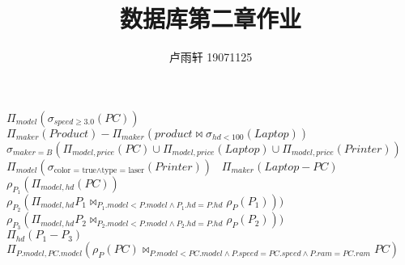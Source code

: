 \documentclass{ctexart}
\title{数据库第二章作业}
\author{卢雨轩 19071125}
\begin{document}
\maketitle

\begin{outline}[enumerate]
    \1[2.4.14]
        \2 $\Pi_{model}(\sigma_{speed \ge 3.0}(PC))$
        \2 $ \Pi_{maker}(Product) - \Pi_{maker}(product \Join \sigma_{hd < 100}(Laptop)) $
        \2 $\sigma_{maker = B}(\Pi_{model, price}(PC) \cup \Pi_{model, price}(Laptop) \cup \Pi_{model, price}(Printer))$
        \2 $\Pi_{model}(\sigma_{\text{color = true}\wedge \text{type = laser}}(Printer))$\
        \2 $\Pi_{maker}(Laptop - PC)$
        \2 $\rho_{P_1}(\Pi_{model, hd}(PC))$ \\
        $\rho_{P_2}(\Pi_{model, hd}P_1 \Join_{P_1.model < P.model \wedge P_1.hd = P.hd}  \rho_{P}(P_1)))$ \\
        $\rho_{P_3}(\Pi_{model, hd}P_2 \Join_{P_2.model < P.model \wedge P_2.hd = P.hd}  \rho_{P}(P_2)))$ \\
        $\Pi_{hd}(P_1 - P_3)$
        \2 $\Pi_{P.model, PC.model}( \rho_P(PC) \Join_{P.model < PC.model \wedge P.speed = PC.speed \wedge  P.ram = PC.ram} PC )$
\end{outline}
\end{document}
